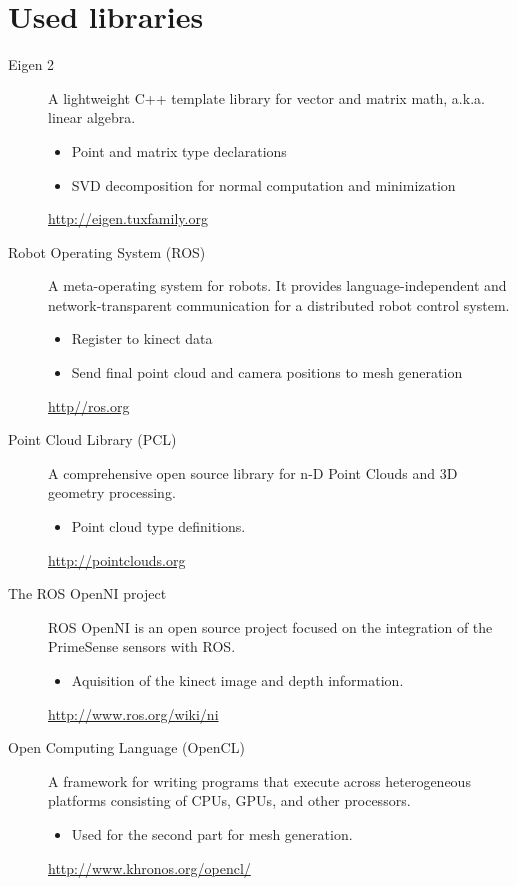 \documentclass[10pt,twocolumn,letterpaper]{article}
\begin{document}
\section{Used libraries}
\label{libraries}
\begin{description}
\item[Eigen 2]
A lightweight C++ template library for vector and matrix math,
a.k.a. linear algebra.

\begin{itemize}
\item Point and matrix type declarations
\item SVD decomposition for normal computation and minimization
\end{itemize}

\href{http://eigen.tuxfamily.org}{http://eigen.tuxfamily.org}

\item[Robot Operating System (ROS)]
A meta-operating system for robots. It provides
language-independent and network-transparent communication for a
distributed robot control system.

\begin{itemize}
\item Register to kinect data
\item Send final point cloud and camera positions to mesh generation
\end{itemize}

\href{http://ros.org}{http//ros.org}

\item[Point Cloud Library (PCL)]
A comprehensive open source library for n-D Point Clouds and 3D geometry processing.

\begin{itemize}
\item Point cloud type definitions.
\end{itemize}

\href{http://pointclouds.org}{http://pointclouds.org}

\item[The ROS OpenNI project]
ROS OpenNI is an open source project focused on the integration of the PrimeSense sensors with ROS.

\begin{itemize}
\item Aquisition of the kinect image and depth information.
\end{itemize}

\href{http://www.ros.org/wiki/ni}{http://www.ros.org/wiki/ni}

\item[Open Computing Language (OpenCL)]
A framework for writing programs that execute across heterogeneous platforms consisting of CPUs, GPUs, and other processors.

\begin{itemize}
\item Used for the second part for mesh generation.
\end{itemize}

\href{http://www.khronos.org/opencl/}{http://www.khronos.org/opencl/}

\end{description}
\end{document}
